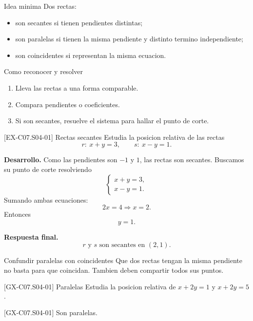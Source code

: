 \begin{theorybox}{Idea minima}
Dos rectas:
\begin{itemize}
  \item son secantes si tienen pendientes distintas;
  \item son paralelas si tienen la misma pendiente y distinto termino independiente;
  \item son coincidentes si representan la misma ecuacion.
\end{itemize}
\end{theorybox}

\begin{methodbox}{Como reconocer y resolver}
\begin{enumerate}
  \item Lleva las rectas a una forma comparable.
  \item Compara pendientes o coeficientes.
  \item Si son secantes, resuelve el sistema para hallar el punto de corte.
\end{enumerate}
\end{methodbox}

\begin{solvedexample}{[EX-C07.S04-01] Rectas secantes}
Estudia la posicion relativa de las rectas
\[
r:\ x+y=3,
\qquad
s:\ x-y=1.
\]

\textbf{Desarrollo.} Como las pendientes son \(-1\) y \(1\), las rectas son secantes.
Buscamos su punto de corte resolviendo
\[
\begin{cases}
x+y=3,\\
x-y=1.
\end{cases}
\]
Sumando ambas ecuaciones:
\[
2x=4 \Longrightarrow x=2.
\]
Entonces
\[
y=1.
\]

\textbf{Respuesta final.}
\[
r \text{ y } s \text{ son secantes en } (2,1).
\]
\end{solvedexample}

\begin{commonerror}{Confundir paralelas con coincidentes}
Que dos rectas tengan la misma pendiente no basta para que coincidan. Tambien deben compartir
todos sus puntos.
\end{commonerror}

\begin{guidedexercise}{[GX-C07.S04-01] Paralelas}
Estudia la posicion relativa de \(x+2y=1\) y \(x+2y=5\).
\end{guidedexercise}

\begin{shortanswer}{[GX-C07.S04-01]}
Son paralelas.
\end{shortanswer}

